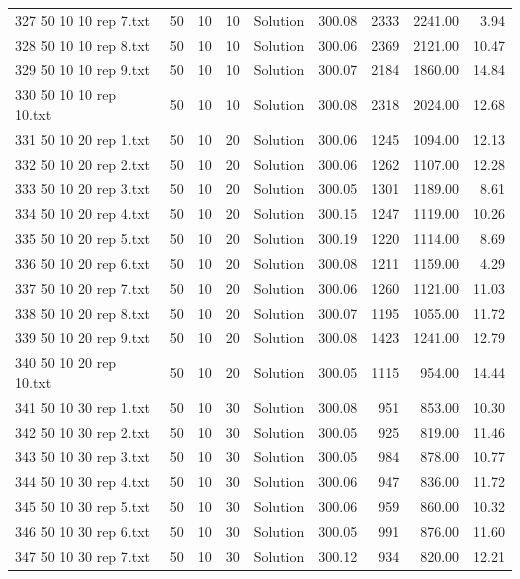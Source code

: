 \begin{longtable}{lrrllrrrr}
327 50 10 10 rep 7.txt & 50 & 10 & 10 & Solution & 300.08 & 2333 & 2241.00 &  3.94\\
328 50 10 10 rep 8.txt & 50 & 10 & 10 & Solution & 300.06 & 2369 & 2121.00 & 10.47\\
329 50 10 10 rep 9.txt & 50 & 10 & 10 & Solution & 300.07 & 2184 & 1860.00 & 14.84\\
330 50 10 10 rep 10.txt & 50 & 10 & 10 & Solution & 300.08 & 2318 & 2024.00 & 12.68\\
331 50 10 20 rep 1.txt & 50 & 10 & 20 & Solution & 300.06 & 1245 & 1094.00 & 12.13\\
332 50 10 20 rep 2.txt & 50 & 10 & 20 & Solution & 300.06 & 1262 & 1107.00 & 12.28\\
333 50 10 20 rep 3.txt & 50 & 10 & 20 & Solution & 300.05 & 1301 & 1189.00 &  8.61\\
334 50 10 20 rep 4.txt & 50 & 10 & 20 & Solution & 300.15 & 1247 & 1119.00 & 10.26\\
335 50 10 20 rep 5.txt & 50 & 10 & 20 & Solution & 300.19 & 1220 & 1114.00 &  8.69\\
336 50 10 20 rep 6.txt & 50 & 10 & 20 & Solution & 300.08 & 1211 & 1159.00 &  4.29\\
337 50 10 20 rep 7.txt & 50 & 10 & 20 & Solution & 300.06 & 1260 & 1121.00 & 11.03\\
338 50 10 20 rep 8.txt & 50 & 10 & 20 & Solution & 300.07 & 1195 & 1055.00 & 11.72\\
339 50 10 20 rep 9.txt & 50 & 10 & 20 & Solution & 300.08 & 1423 & 1241.00 & 12.79\\
340 50 10 20 rep 10.txt & 50 & 10 & 20 & Solution & 300.05 & 1115 & 954.00 & 14.44\\
341 50 10 30 rep 1.txt & 50 & 10 & 30 & Solution & 300.08 & 951 & 853.00 & 10.30\\
342 50 10 30 rep 2.txt & 50 & 10 & 30 & Solution & 300.05 & 925 & 819.00 & 11.46\\
343 50 10 30 rep 3.txt & 50 & 10 & 30 & Solution & 300.05 & 984 & 878.00 & 10.77\\
344 50 10 30 rep 4.txt & 50 & 10 & 30 & Solution & 300.06 & 947 & 836.00 & 11.72\\
345 50 10 30 rep 5.txt & 50 & 10 & 30 & Solution & 300.06 & 959 & 860.00 & 10.32\\
346 50 10 30 rep 6.txt & 50 & 10 & 30 & Solution & 300.05 & 991 & 876.00 & 11.60\\
347 50 10 30 rep 7.txt & 50 & 10 & 30 & Solution & 300.12 & 934 & 820.00 & 12.21\\

\end{longtable}
